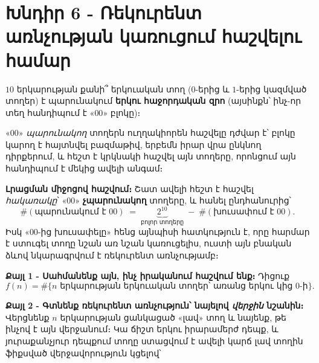 \documentclass[11pt,a4paper]{article}
\begin{document}
\section*{Խնդիր 6 - Ռեկուրենտ առնչության կառուցում հաշվելու համար}

\begin{problembox}[6]
$10$ երկարության քանի՞ երկուական տող ($0$-երից և $1$-երից կազմված տողեր) է պարունակում
\textbf{երկու հաջորդական զրո} (այսինքն՝ ինչ-որ տեղ հանդիպում է «$00$» բլոկը)։
\end{problembox}

\begin{ideabox}
«$00$» \emph{պարունակող} տողերն ուղղակիորեն հաշվելը դժվար է՝ բլոկը կարող է հայտնվել բազմաթիվ,
երբեմն իրար վրա ընկնող դիրքերում, և հեշտ է կրկնակի հաշվել այն տողերը, որոնցում այն հանդիպում է
մեկից ավելի անգամ։

\textbf{Լրացման միջոցով հաշվում։} Շատ ավելի հեշտ է հաշվել \emph{հակառակը}՝ «$00$»
\textbf{չպարունակող} տողերը, և հանել ընդհանուրից՝
\[
\#(\text{պարունակում է }00) \;=\; \underbrace{2^{10}}_{\text{բոլոր տողերը}} \;-\; \#(\text{խուսափում է }00).
\]
Իսկ «$00$-ից խուսափելը» հենց այնպիսի հատկություն է, որը հարմար է ստուգել տողը նշան առ նշան
կառուցելիս, ուստի այն բնական ձևով նկարագրվում է ռեկուրենտ առնչությամբ։
\end{ideabox}

\textbf{Քայլ 1 - Սահմանենք այն, ինչ իրականում հաշվում ենք։}
Դիցուք
\[
f(n) = \#\{n \text{ երկարության երկուական տողեր՝ առանց երկու կից } 0\text{-ի}\}.
\]

\textbf{Քայլ 2 - Գտնենք ռեկուրենտ առնչություն՝ նայելով \emph{վերջին} նշանին։}
Վերցնենք $n$ երկարության ցանկացած «լավ» տող և նայենք, թե ինչով է այն վերջանում։ Կա ճիշտ երկու
իրարամերժ դեպք, և յուրաքանչյուր դեպքում տողը ստացվում է ավելի կարճ լավ տողին ֆիքսված
վերջավորություն կցելով՝

\begin{center}
\end{center}
\end{document}
